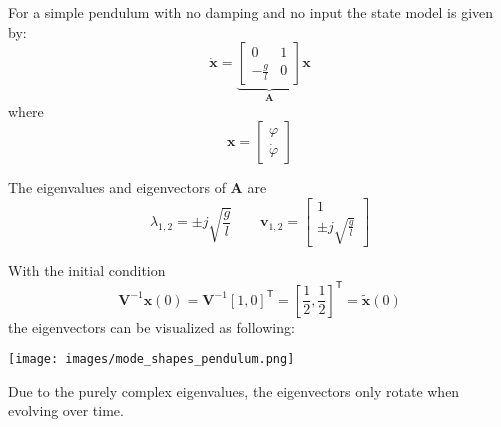 \begin{examplesection}
    For a simple pendulum with no damping and no input the state model is given by:
    \begin{equation*}
        \dot{\mathbf{x}}=\underbrace{\begin{bmatrix}
                0            & 1 \\
                -\frac{g}{l} & 0
            \end{bmatrix}}_{\mathbf{A}}\mathbf{x}
    \end{equation*}
    where
    \begin{equation*}
        \mathbf{x}=\begin{bmatrix}
            \varphi \\
            \dot{\varphi}
        \end{bmatrix}
    \end{equation*}

    The eigenvalues and eigenvectors of $\mathbf{A}$ are
    \begin{equation*}
        \lambda_{1,2} = \pm j \sqrt{\frac{g}{l}} \qquad \mathbf{v}_{1,2}=\begin{bmatrix}
            1 \\
            \pm j \sqrt{\frac{g}{l}}
        \end{bmatrix}
    \end{equation*}

    With the initial condition
    \noindent\begin{equation*}
        \mathbf{V}^{-1}\mathbf{x}(0) = \mathbf{V}^{-1}{[1, 0]}^{\mathsf{T}} = {\left[\frac{1}{2}, \frac{1}{2}\right]}^{\mathsf{T}} = \tilde{\mathbf{x}}(0)
    \end{equation*}
    the eigenvectors can be visualized as following:

    \texttt{[image: images/mode\_shapes\_pendulum.png]}

    Due to the purely complex eigenvalues, the eigenvectors only rotate when evolving over time.


\end{examplesection}
